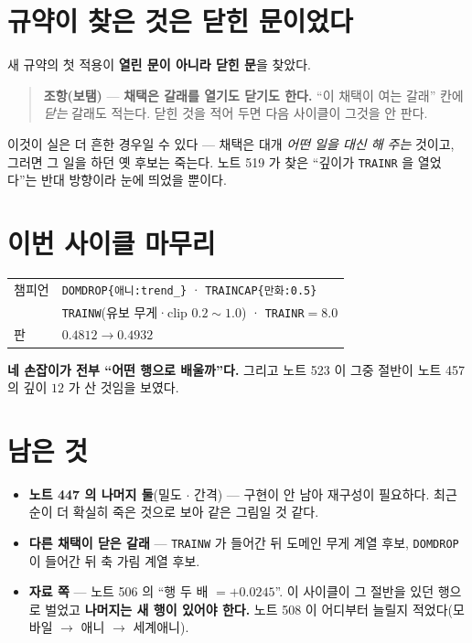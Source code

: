 \documentclass[11pt]{article}
\begin{document}
\section{규약이 찾은 것은 닫힌 문이었다}

새 규약의 첫 적용이 \textbf{열린 문이 아니라 닫힌 문}을 찾았다.

\begin{quote}
\textbf{조항(보탬)} --- \textbf{채택은 갈래를 열기도 닫기도 한다.} ``이
채택이 여는 갈래'' 칸에 \emph{닫는} 갈래도 적는다. 닫힌 것을 적어 두면
다음 사이클이 그것을 안 판다.
\end{quote}

이것이 실은 더 흔한 경우일 수 있다 --- 채택은 대개 \emph{어떤 일을 대신
해 주는} 것이고, 그러면 그 일을 하던 옛 후보는 죽는다. 노트 519 가 찾은
``깊이가 \texttt{TRAINR} 을 열었다''는 반대 방향이라 눈에 띄었을 뿐이다.

\section*{이번 사이클 마무리}

\begin{center}
\begin{tabular}{ll}
\hline
챔피언 & \texttt{DOMDROP\{애니:trend\_\}} · \texttt{TRAINCAP\{만화:0.5\}} \\
 & \texttt{TRAINW}(유보 무게·clip $0.2\!\sim\!1.0$) · \texttt{TRAINR}$=8.0$ \\
판 & $0.4812 \to \mathbf{0.4932}$ \\
\hline
\end{tabular}
\end{center}

\textbf{네 손잡이가 전부 ``어떤 행으로 배울까''다.} 그리고 노트 523 이
그중 절반이 노트 457 의 깊이 $12$ 가 산 것임을 보였다.

\section*{남은 것}

\begin{itemize}
\item \textbf{노트 447 의 나머지 둘}(밀도 $\cdot$ 간격) --- 구현이 안
남아 재구성이 필요하다. 최근순이 더 확실히 죽은 것으로 보아 같은 그림일
것 같다.
\item \textbf{다른 채택이 닫은 갈래} --- \texttt{TRAINW} 가 들어간 뒤
도메인 무게 계열 후보, \texttt{DOMDROP} 이 들어간 뒤 축 가림 계열 후보.
\item \textbf{자료 쪽} --- 노트 506 의 ``행 두 배 $= +0.0245$''. 이
사이클이 그 절반을 있던 행으로 벌었고 \textbf{나머지는 새 행이 있어야
한다.} 노트 508 이 어디부터 늘릴지 적었다(모바일 $\to$ 애니 $\to$ 세계애니).
\end{itemize}
\end{document}
